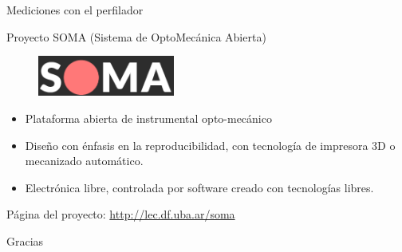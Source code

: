 \begin{frame}{Mediciones con el perfilador}
\end{frame}





\begin{frame}[t,fragile]{Proyecto SOMA (Sistema de OptoMecánica Abierta)}

\centering

\begin{figure}[H]
\centering
\includegraphics[width=0.4\textwidth]{fig/proyecto_soma}
\label{fig:soma}
\end{figure}

\begin{itemize}
\item Plataforma abierta de instrumental opto-mecánico
\item Diseño con énfasis en la reproducibilidad, con tecnología de impresora 3D o mecanizado automático.
\item Electrónica libre, controlada por software creado con tecnologías libres.
\end{itemize}

Página del proyecto: \url{http://lec.df.uba.ar/soma}

\end{frame}








\begin{frame}[plain]{}
\centering

\Huge
Gracias

\end{frame}

